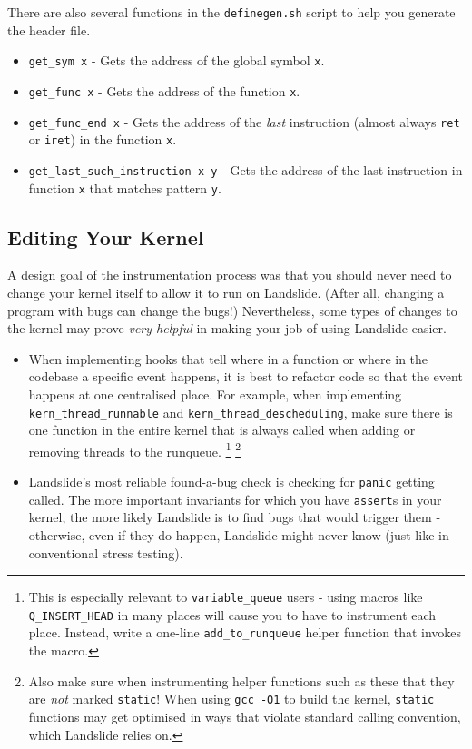 \documentclass{article}
\begin{document}
There are also several functions in the \texttt{definegen.sh} script to help you generate the header file.
\begin{itemize}
	\item \texttt{get\_sym x} - Gets the address of the global symbol \texttt{x}.
	\item \texttt{get\_func x} - Gets the address of the function \texttt{x}.
	\item \texttt{get\_func\_end x} - Gets the address of the {\em last} instruction (almost always \texttt{ret} or \texttt{iret}) in the function \texttt{x}.
	\item \texttt{get\_last\_such\_instruction x y} - Gets the address of the last instruction in function \texttt{x} that matches pattern \texttt{y}.
\end{itemize}

\subsection{Editing Your Kernel}

A design goal of the instrumentation process was that you should never need to change your kernel itself to allow it to run on Landslide. (After all, changing a program with bugs can change the bugs!)
Nevertheless, some types of changes to the kernel may prove {\em very helpful} in making your job of using Landslide easier.

\begin{itemize}
	\item When implementing hooks that tell where in a function or where in the codebase a specific event happens, it is best to refactor code so that the event happens at one centralised place.
		For example, when implementing \texttt{kern\_thread\_runnable} and \texttt{kern\_thread\_descheduling}, make sure there is one function in the entire kernel that is always called when adding or removing threads to the runqueue.
		\footnote{This is especially relevant to \texttt{variable\_queue} users - using macros like \texttt{Q\_INSERT\_HEAD} in many places will cause you to have to instrument each place. Instead, write a one-line \texttt{add\_to\_runqueue} helper function that invokes the macro.}
		\footnote{Also make sure when instrumenting helper functions such as these that they are {\em not} marked \texttt{static}! When using \texttt{gcc -O1} to build the kernel, \texttt{static} functions may get optimised in ways that violate standard calling convention, which Landslide relies on.}
	\item Landslide's most reliable found-a-bug check is checking for \texttt{panic} getting called.
		The more important invariants for which you have \texttt{assert}s in your kernel, the more likely Landslide is to find bugs that would trigger them - otherwise, even if they do happen, Landslide might never know (just like in conventional stress testing).
\end{itemize}
\end{document}
